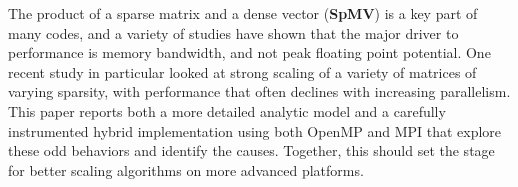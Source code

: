 The product of a sparse matrix and a dense vector (\textbf{SpMV}) is a key part of many codes, and a variety of studies have shown that the major driver to performance is memory bandwidth, and not peak floating point potential. One recent study in particular looked at strong scaling of a variety of matrices of varying sparsity, with performance that often declines with increasing parallelism. This paper reports both a more detailed analytic model and a carefully instrumented hybrid implementation using both OpenMP and MPI that explore these odd behaviors and identify the causes. Together, this should set the stage for better scaling algorithms on more advanced platforms.